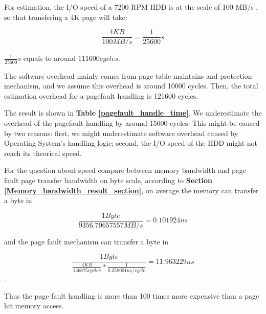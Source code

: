 For estimation, the I/O speed of a 7200 RPM HDD is at the scale of 100 MB/s \cite{wiki:hdd}, so that transfering a 4K page will take:

$$ \frac{4KB}{100 MB/s} = \frac{1}{25600} s $$

$\frac{1}{25600} s$ equals to around $111600 cycles$.

The software overhead mainly comes from page table maintains and protection mechanism, and we assume this overhead is around 10000 cycles. Then, the total estimation overhead for a pagefault handling is 121600 cycles.

The result is shown in \textbf{Table \ref{pagefault_handle_time}}. We underestimate the overhead of the pagefault handling by around 15000 cycles. This might be caused by two reasons: first, we might underestimate software overhead caused by Operating System's handling logic; second, the I/O speed of the HDD might not reach its theorical speed.

For the question about speed compare between memory bandwidth and page fault page transfer bandwidth on byte scale, according to \textbf{Section \ref{Memory_bandwidth_result_section}}, on average the memory can transfer a byte in

$$\frac{1 Byte}{9356.70657557 MB/s} = 0.101924 ns $$

and the page fault mechanism can transfer a byte in

$$\frac{1 Byte}{\frac{4 KB}{136875 cycles} * \frac{1}{0.358001 ns/cycle}} = 11.963229 ns $$.

Thus the page fault handling is more than 100 times more expensive than a page hit memory access.
